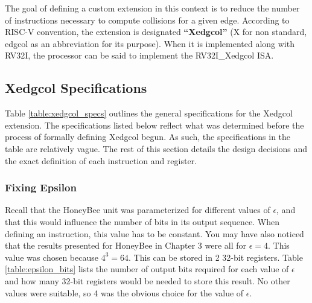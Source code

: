 
The goal of defining a custom extension in this context is to reduce the number of instructions necessary to compute collisions for a given edge. According to RISC-V convention, the extension is designated \textbf{``Xedgcol''} (X for non standard, edgcol as an abbreviation for its purpose). When it is implemented along with RV32I, the processor can be said to implement the RV32I\_Xedgcol ISA.

\subsection{Xedgcol Specifications}
    Table \ref{table:xedgcol_specs} outlines the general specifications for the Xedgcol extension. The specifications listed below reflect what was determined before the process of formally defining Xedgcol begun. As such, the specifications in the table are relatively vague. The rest of this section details the design decisions and the exact definition of each instruction and register.

    

    \subsubsection{Fixing Epsilon}
        Recall that the HoneyBee unit was parameterized for different values of $\epsilon$, and that this would influence the number of bits in its output sequence. When defining an instruction, this value has to be constant. You may have also noticed that the results presented for HoneyBee in Chapter 3 were all for $\epsilon = 4$. This value was chosen because $4^3 = 64$. This can be stored in 2 32-bit registers. Table \ref{table:epsilon_bits} lists the number of output bits required for each value of $\epsilon$ and how many 32-bit registers would be needed to store this result. No other values were suitable, so 4 was the obvious choice for the value of $\epsilon$.

    


